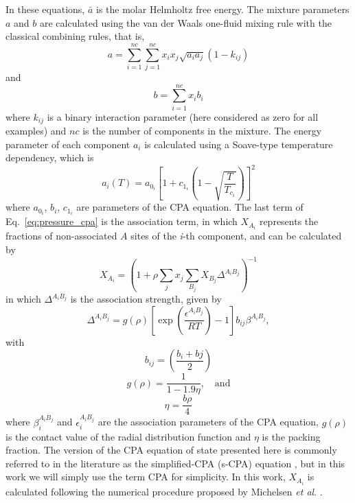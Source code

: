\documentclass[preprint,12pt,3p]{elsarticle}
\begin{document}
	In these equations, $\bar{a}$ is the molar Helmholtz free energy. The mixture parameters $a$ and $b$ are calculated using the van der Waals one-fluid mixing rule with the classical combining rules, that is,
\begin{equation}
    a = \sum_{i=1}^{nc} \sum_{j=1}^{nc} x_{i}x_{j}\sqrt{a_{i}a_{j}}(1-k_{ij})
\end{equation}
and
\begin{equation}
    b = \sum_{i=1}^{nc}x_{i}b_{i}
\end{equation}
	where $k_{ij}$ is a binary interaction parameter (here considered as zero for all examples) and $nc$ is the number of components in the mixture. The energy parameter of each component $a_{i}$ is calculated using a Soave-type temperature dependency, which is
\begin{equation}
    a_{i}(T) = a_{0_{i}}\left[1+c_{1_{i}}\left(1-\sqrt{\frac{T}{T_{c_{i}}}}\right)\right]^2
\end{equation}
    where $a_{0_{i}}$, $b_{i}$, $c_{1_{i}}$ are parameters of the CPA equation. The last term of Eq.~\ref{eq:pressure_cpa} is the association term, in which $X_{A_{i}}$ represents the fractions of non-associated $A$ sites of the \textit{i}-th component, and can be calculated by
\begin{equation} \label{eq:frac_nb}
    X_{A_{i}} = \left(1+\rho \sum_{j}x_{j} \sum_{B_{j}} X_{B_{j}} \Delta^{A_{i}B_{j}}\right)^{-1}
\end{equation}
    in which $\Delta^{A_{i}B_{j}}$ is the association strength, given by
\begin{equation} \label{eq:delta_cpa}
    \Delta^{A_{i}B_{j}} = g(\rho)\left[\exp\left(\frac{\epsilon^{A_{i}B_{j}}}{RT}\right)-1\right]b_{ij}\beta^{A_{i}B_{j}},
\end{equation}
with
\begin{equation} \label{eq:bij}
    b_{ij} = \left(\frac{b_{i}+b{j}}{2}\right)
\end{equation}
\begin{equation} \label{eq:g_cpa}
    g(\rho) = \frac{1}{1-1.9\eta}, \quad \text{and}
\end{equation}
\begin{equation} \label{eq:eta_cpa}
    \eta = \frac{b\rho}{4}
\end{equation}
	where $\beta_{i}^{A_{i}B_{j}}$ and $\epsilon_{i}^{A_{i}B_{j}}$ are the association parameters of the CPA equation, $g(\rho)$ is the contact value of the radial distribution function and $\eta$ is the packing fraction. The version of the CPA equation of state presented here is commonly referred to in the literature as the simplified-CPA (s-CPA) equation \citep{kontogeorgis1999multicomponent}, but in this work we will simply use the term CPA for simplicity. In this work, $X_{A_{i}}$ is calculated following the numerical procedure proposed by Michelsen \textit{et al}.  \citep{michelsen2006robust}.
\end{document}
